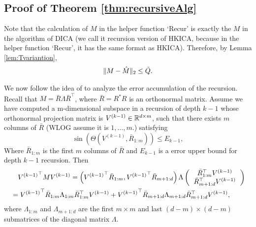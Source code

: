\subsection{Proof of Theorem \ref{thm:recursiveAlg}}
Note that the calculation of $M$ in the helper function `Recur' is exactly the $M$ in the algorithm of DICA (we call it recursion version of HKICA, because in the helper function `Recur', it has the same format as HKICA).
Therefore, by Lemma \ref{lem:Tvariantion},
\[
\|M-\hat{M}\|_2 \le \tilde{Q}.
\]

We now follow the idea of \citet{vempala2014max} to analyze the error accumulation of the recursion.
Recall that $M = \bar{R}\Lambda\bar{R}^{\top}$, where $\bar{R} = R^*R$ is an orthonormal matrix.
Assume we have computed a m-dimensional subspace in a recursion of depth $k-1$ whose orthonormal projection matrix is $V^{(k-1)} \in \mathbb{R}^{d\times m}$, such that there exists $m$ columns of $\bar{R}$ (WLOG assume it is $1,\ldots,m$.) satisfying
\[
\sin\left(\Theta\left(V^{(k-1)}, \bar{R}_{1:m}\right)\right) \le E_{k-1},
\] 
Where $\bar{R}_{1:m}$ is the first $m$ columns of $\bar{R}$ and $E_{k-1}$ is a error upper bound for depth $k-1$ recursion.
Then
\begin{align*}
& \quad {V^{(k-1)}}^\top MV^{(k-1)} = \left( {V^{(k-1)}}^\top\bar{R}_{1:m}, {V^{(k-1)}}^\top\bar{R}_{m+1:d}\right)\Lambda
\left(
\begin{tabular}{c}
$\bar{R}_{1:m}^{\top} V^{(k-1)}$ \\
$\bar{R}_{m+1:d}^{\top} V^{(k-1)}$
\end{tabular}
\right) \\
& = {V^{(k-1)}}^\top\bar{R}_{1:m}\Lambda_{1:m} \bar{R}_{1:m}^{\top} V^{(k-1)} + {V^{(k-1)}}^\top\bar{R}_{m+1:d}\Lambda_{m+1:d}\bar{R}_{m+1:d}^{\top} V^{(k-1)},
\end{align*}
where $\Lambda_{1:m}$ and $\Lambda_{m+1:d}$ are the first $m\times m$  and last $(d-m)\times (d-m)$ submatrices of the diagonal matrix $\Lambda$.

